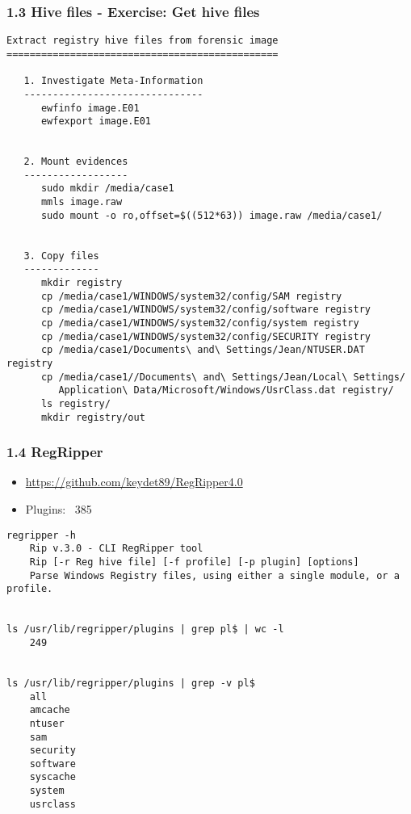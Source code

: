 \begin{frame}[fragile]
  \frametitle{1.3 Hive files - Exercise: Get hive files}
    \begin{lstlisting}[basicstyle=\tiny]
Extract registry hive files from forensic image
===============================================

   1. Investigate Meta-Information
   -------------------------------
      ewfinfo image.E01
      ewfexport image.E01


   2. Mount evidences
   ------------------
      sudo mkdir /media/case1
      mmls image.raw
      sudo mount -o ro,offset=$((512*63)) image.raw /media/case1/


   3. Copy files
   -------------
      mkdir registry
      cp /media/case1/WINDOWS/system32/config/SAM registry
      cp /media/case1/WINDOWS/system32/config/software registry
      cp /media/case1/WINDOWS/system32/config/system registry
      cp /media/case1/WINDOWS/system32/config/SECURITY registry
      cp /media/case1/Documents\ and\ Settings/Jean/NTUSER.DAT registry
      cp /media/case1//Documents\ and\ Settings/Jean/Local\ Settings/
         Application\ Data/Microsoft/Windows/UsrClass.dat registry/
      ls registry/
      mkdir registry/out
    \end{lstlisting}
\end{frame}


\begin{frame}[fragile]
  \frametitle{1.4 RegRipper}
  \begin{itemize}
	  \item \url{https://github.com/keydet89/RegRipper4.0}
	  \item Plugins: ~385
  \end{itemize}
    \begin{lstlisting}[basicstyle=\tiny]
regripper -h
	Rip v.3.0 - CLI RegRipper tool	
	Rip [-r Reg hive file] [-f profile] [-p plugin] [options]
	Parse Windows Registry files, using either a single module, or a profile.


ls /usr/lib/regripper/plugins | grep pl$ | wc -l
	249


ls /usr/lib/regripper/plugins | grep -v pl$
	all
	amcache
	ntuser
	sam
	security
	software
	syscache
	system
	usrclass
    \end{lstlisting}
\end{frame}



